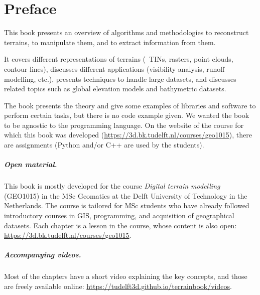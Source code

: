 


\chapter*{Preface}

This book presents an overview of algorithms and methodologies to reconstruct terrains, to manipulate them, and to extract information from them.

It covers different representations of terrains (\eg\ TINs, rasters, point clouds, contour lines), discusses different applications (visibility analysis, runoff modelling, etc.), presents techniques to handle large datasets, and discusses related topics such as global elevation models and bathymetric datasets.

The book presents the theory and give some examples of libraries and software to perform certain tasks, but there is no code example given.
We wanted the book to be agnostic to the programming language.
On the website of the course for which this book was developed (\url{https://3d.bk.tudelft.nl/courses/geo1015}), there are assignments (Python and/or C++ are used by the students).



\paragraph*{Open material.}
This book is mostly developed for the course \emph{Digital terrain modelling} (GEO1015) in the MSc Geomatics at the Delft University of Technology in the Netherlands.
The course is tailored for MSc students who have already followed  introductory courses in GIS, programming, and acquisition of geographical datasets.
Each chapter is a lesson in the course, whose content is also open: \url{https://3d.bk.tudelft.nl/courses/geo1015}.


\paragraph*{Accompanying videos.}
Most of the chapters have a short video explaining the key concepts, and those are freely available online: \url{https://tudelft3d.github.io/terrainbook/videos}.


